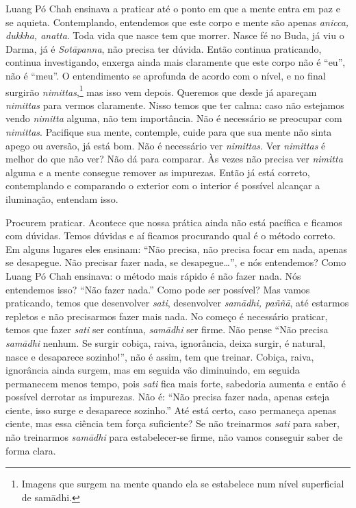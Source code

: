 Luang Pó Chah ensinava a praticar até o ponto em que a mente entra
em paz e se aquieta. Contemplando, entendemos que este corpo e mente
são apenas \textit{anicca, dukkha, anatta}. Toda vida que nasce tem que
morrer. Nasce fé no Buda, já viu o Darma, já é \textit{Sotāpanna},
não precisa ter dúvida. Então continua praticando, continua
investigando, enxerga ainda mais claramente que este corpo não é “eu”,
não é “meu”. O entendimento se aprofunda de acordo com o nível, e no
final surgirão \textit{nimittas},\footnote{Imagens que surgem na mente
quando ela se estabelece num nível superficial de samādhi.} mas isso
vem depois. Queremos que desde já apareçam \textit{nimittas} para
vermos claramente. Nisso temos que ter calma: caso não estejamos vendo
\textit{nimitta} alguma, não tem importância. Não é necessário se
preocupar com \textit{nimittas}. Pacifique sua mente, contemple, cuide
para que sua mente não sinta apego ou aversão, já está bom. Não é
necessário ver \textit{nimittas}. Ver \textit{nimittas} é melhor do que
não ver? Não dá para comparar. Às vezes não precisa ver
\textit{nimitta} alguma e a mente consegue remover as impurezas. Então
já está correto, contemplando e comparando o exterior com o interior é
possível alcançar a iluminação, entendam isso. 

Procurem praticar. Acontece que nossa prática ainda não está
pacífica e ficamos com dúvidas. Temos dúvidas e aí ficamos procurando
qual é o método correto. Em alguns lugares eles ensinam: “Não precisa,
não precisa focar em nada, apenas se desapegue. Não precisar fazer
nada, se desapegue…”, e nós entendemos? Como Luang Pó Chah ensinava: o
método mais rápido é não fazer nada. Nós entendemos isso? “Não fazer
nada.” Como pode ser possível? Mas vamos praticando, temos que
desenvolver \textit{sati}, desenvolver \textit{samādhi, paññā}, até
estarmos repletos e não precisarmos fazer mais nada. No começo é
necessário praticar, temos que fazer \textit{sati} ser contínua,
\textit{samādhi} ser firme. Não pense “Não precisa \textit{samādhi}
nenhum. Se surgir cobiça, raiva, ignorância, deixa surgir, é natural,
nasce e desaparece sozinho!”, não é assim, tem que treinar. Cobiça,
raiva, ignorância ainda surgem, mas em seguida vão diminuindo, em
seguida permanecem menos tempo, pois \textit{sati} fica mais forte,
sabedoria aumenta e então é possível derrotar as impurezas. Não é: “Não
precisa fazer nada, apenas esteja ciente, isso surge e desaparece
sozinho.” Até está certo, caso permaneça apenas ciente, mas essa
ciência tem força suficiente? Se não treinarmos \textit{sati} para
saber, não treinarmos \textit{samādhi} para estabelecer-se firme, não
vamos conseguir saber de forma clara. 

